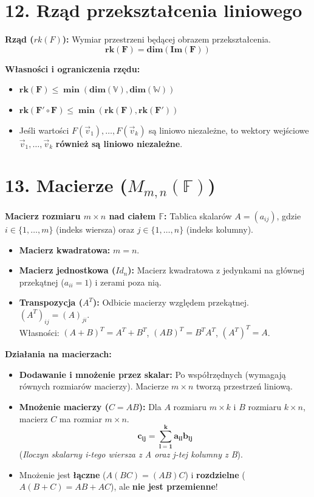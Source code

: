 \documentclass[12pt,a4paper]{article}
\begin{document}
\section*{12. Rząd przekształcenia liniowego}
\noindent\textbf{Rząd ($rk(F)$):} Wymiar przestrzeni będącej obrazem przekształcenia.
$$ \mathbf{rk(F) = dim(Im(F))} $$

\noindent\textbf{Własności i ograniczenia rzędu:}
\begin{itemize}
    \item $\mathbf{rk(F) \le \min(dim(\mathbb{V}), dim(\mathbb{W}))}$
    \item $\mathbf{rk(F' \circ F) \le \min(rk(F), rk(F'))}$
    \item Jeśli wartości $F(\vec{v}_1), \dots, F(\vec{v}_k)$ są liniowo niezależne, to wektory wejściowe $\vec{v}_1, \dots, \vec{v}_k$ \textbf{również są liniowo niezależne}.
\end{itemize}

\section*{13. Macierze ($M_{m,n}(\mathbb{F})$)}
\noindent\textbf{Macierz rozmiaru $m \times n$ nad ciałem $\mathbb{F}$:} Tablica skalarów $A = (a_{ij})$, gdzie $i \in \{1,\dots,m\}$ (indeks wiersza) oraz $j \in \{1,\dots,n\}$ (indeks kolumny).
\begin{itemize}
    \item \textbf{Macierz kwadratowa:} $m = n$.
    \item \textbf{Macierz jednostkowa ($Id_n$):} Macierz kwadratowa z jedynkami na głównej przekątnej ($a_{ii}=1$) i zerami poza nią.
    \item \textbf{Transpozycja ($A^T$):} Odbicie macierzy względem przekątnej. $(A^T)_{ij} = (A)_{ji}$. \\
    Własności: $(A+B)^T = A^T + B^T$, $(AB)^T = B^T A^T$, $(A^T)^T = A$.
\end{itemize}

\noindent\textbf{Działania na macierzach:}
\begin{itemize}
    \item \textbf{Dodawanie i mnożenie przez skalar:} Po współrzędnych (wymagają równych rozmiarów macierzy). Macierze $m \times n$ tworzą przestrzeń liniową.
    \item \textbf{Mnożenie macierzy ($C = AB$):} Dla $A$ rozmiaru $m \times k$ i $B$ rozmiaru $k \times n$, macierz $C$ ma rozmiar $m \times n$.
    $$ \mathbf{c_{ij} = \sum_{l=1}^k a_{il} b_{lj}} $$
    (\textit{Iloczyn skalarny i-tego wiersza z A oraz j-tej kolumny z B}).
    \item Mnożenie jest \textbf{łączne} ($A(BC) = (AB)C$) i \textbf{rozdzielne} ($A(B+C) = AB+AC$), ale \textbf{nie jest przemienne}!
\end{itemize}
\end{document}
